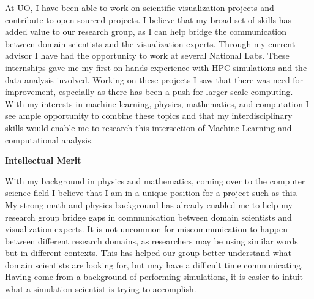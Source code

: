 \documentclass[12pt]{article}
\begin{document}
At UO, I have been able to work on scientific visualization
projects and contribute to open sourced projects. I believe that my broad set of
skills has added value to our research group, as I can help bridge the
communication between domain scientists and the visualization experts. Through
my current advisor I have had the opportunity to work at several National Labs.
These internships gave me my first on-hands experience with HPC simulations and
the data analysis involved. Working on these projects I saw that there was need
for improvement, especially as there has been a push for larger scale computing.
With my interests in machine learning, physics, mathematics, and computation I
see ample opportunity to combine these topics and that my interdisciplinary
skills would enable me to research this intersection of Machine Learning and
computational analysis.

\textbf{Intellectual Merit}
%

With my background in physics and mathematics, coming over to the computer
science field I believe that I am in a unique position for a project such as
this. My strong math and physics background has already enabled me to help my
research group bridge gaps in communication between domain scientists and
visualization experts. It is not uncommon for miscommunication to happen between
different research domains, as researchers may be using similar words but in
different contexts. This has helped our group better understand what domain
scientists are looking for, but may have a difficult time communicating. Having
come from a background of performing simulations, it is easier to intuit what a
simulation scientist is trying to accomplish.
\end{document}
